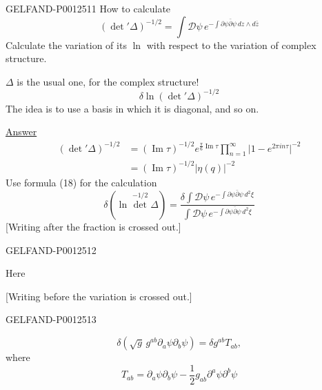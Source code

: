 \begin{GelfandAdjacentEvidence}{GELFAND-P001251}{1}
How to calculate
\begin{equation*}
(\det'\Delta)^{-1/2}
=\int\mathcal D\psi\,e^{-\int\partial\psi\bar\partial\psi\,dz\wedge d\bar z}\tag{18}
\end{equation*}
Calculate the variation of its $\ln$ with respect to the variation of complex structure.

$\Delta$ is the usual one, for the complex structure!
\begin{equation*}
\delta\ln(\det'\Delta)^{-1/2}\tag{19}
\end{equation*}
The idea is to use a basis in which it is diagonal, and so on.

\underline{Answer}
\begin{equation*}
\begin{aligned}
(\det'\Delta)^{-1/2}
&=(\operatorname{Im}\tau)^{-1/2}e^{\frac{\pi}{6}\operatorname{Im}\tau}
\prod_{n=1}^{\infty}\lvert1-e^{2\pi in\tau}\rvert^{-2}\\
&=(\operatorname{Im}\tau)^{-1/2}\lvert\eta(q)\rvert^{-2}
\end{aligned}\tag{20}
\end{equation*}
Use formula (18) for the calculation
\begin{equation*}
\delta(\ln\det^{-1/2}\Delta)
=\frac{\delta\int\mathcal D\psi\,e^{-\int\partial\psi\bar\partial\psi\,d^2\xi}}
{\int\mathcal D\psi\,e^{-\int\partial\psi\bar\partial\psi\,d^2\xi}}\tag{21}
\end{equation*}
[Writing after the fraction is crossed out.]
\end{GelfandAdjacentEvidence}
\begin{GelfandAdjacentEvidence}{GELFAND-P001251}{2}


Here

[Writing before the variation is crossed out.]
\end{GelfandAdjacentEvidence}
\begin{GelfandAdjacentEvidence}{GELFAND-P001251}{3}

\begin{equation*}
\delta(\sqrt g\,g^{ab}\partial_a\psi\partial_b\psi)=\delta g^{ab}T_{ab},
\end{equation*}
where
\begin{equation*}
T_{ab}=\partial_a\psi\partial_b\psi-\frac12g_{ab}\partial^a\psi\partial^b\psi
\end{equation*}
\end{GelfandAdjacentEvidence}
